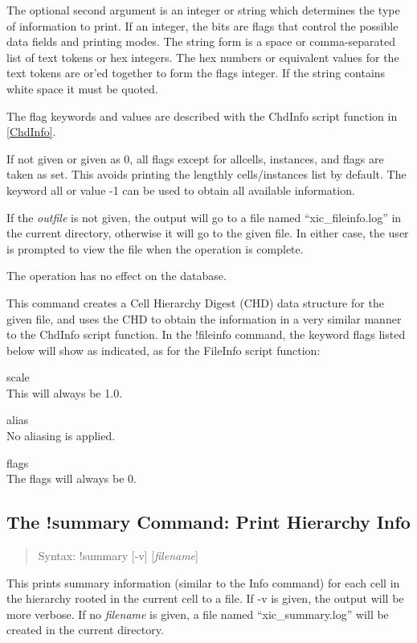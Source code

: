 The optional second argument is an integer or string which determines
the type of information to print.  If an integer, the bits are flags
that control the possible data fields and printing modes.  The string
form is a space or comma-separated list of text tokens or hex
integers.  The hex numbers or equivalent values for the text tokens
are or'ed together to form the flags integer.  If the string contains
white space it must be quoted.

The flag keywords and values are described with the {\vt ChdInfo}
script function in \ref{ChdInfo}.

If not given or given as 0, all flags except for {\vt allcells}, {\vt
instances}, and {\vt flags} are taken as set.  This avoids printing
the lengthly cells/instances list by default.  The keyword {\vt all}
or value -1 can be used to obtain all available information.

If the {\it outfile} is not given, the output will go to a file named
``{\vt xic\_fileinfo.log}'' in the current directory, otherwise it
will go to the given file.  In either case, the user is prompted to
view the file when the operation is complete.

The operation has no effect on the database.

This command creates a Cell Hierarchy Digest (CHD) data structure for
the given file, and uses the CHD to obtain the information in a very
similar manner to the {\vt ChdInfo} script function.  In the {\cb
!fileinfo} command, the keyword flags listed below will show as
indicated, as for the {\vt FileInfo} script function:

\begin{description}
\item{\vt scale}\\
This will always be 1.0.
\item{\vt alias}\\
No aliasing is applied.
\item{\vt flags}\\
The flags will always be 0.
\end{description}

\subsection{The {\cb !summary} Command: Print Hierarchy Info}
\begin{quote}
Syntax: {\vt !summary} [{\vt -v}] [{\it filename\/}]
\end{quote}
This prints summary information (similar to the {\cb Info} command)
for each cell in the hierarchy rooted in the current cell to a file. 
If {\vt -v} is given, the output will be more verbose.  If no {\it
filename} is given, a file named ``{\vt xic\_summary.log}'' will be
created in the current directory.

